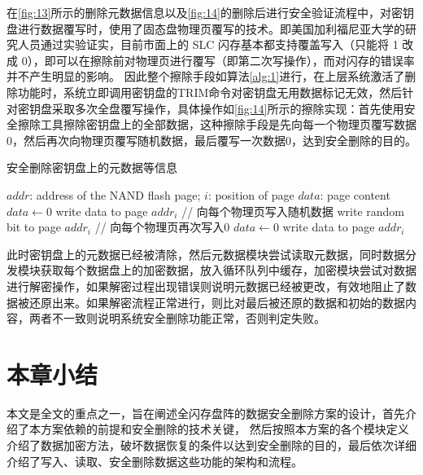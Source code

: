 在\autoref{fig:13}所示的删除元数据信息以及\autoref{fig:14}的删除后进行安全验证流程中，对密钥盘进行数据覆写时，使用了固态盘物理页覆写的技术。即美国加利福尼亚大学的研究人员通过实验证实\cite{Wei2011Reliably}，目前市面上的 SLC 闪存基本都支持覆盖写入（只能将 1 改成 0），即可以在擦除前对物理页进行覆写（即第二次写操作），而对闪存的错误率并不产生明显的影响。
因此整个擦除手段如算法\autoref{alg:1}进行，在上层系统激活了删除功能时，系统立即调用密钥盘的TRIM命令对密钥盘无用数据标记无效，然后针对密钥盘采取多次全盘覆写操作，具体操作如\autoref{fig:14}所示的擦除实现：首先使用安全擦除工具擦除密钥盘上的全部数据，这种擦除手段是先向每一个物理页覆写数据0，然后再次向物理页覆写随机数据，最后覆写一次数据0，达到安全删除的目的。
\begin{algorithm}[htb]
\caption{安全删除密钥盘上的元数据等信息}
\label{alg:1}
\begin{algorithmic}
	\REQUIRE
	$addr$: address of the NAND flash page;
	$i$: position of page
	$data$: page content
	\STATE $data \gets 0$
	\STATE write data to page $addr_i$
	\ENDFOR
	\STATE // 向每个物理页写入随机数据
	\STATE write random bit to page $addr_i$
	\ENDFOR
	\STATE // 向每个物理页再次写入0
	\STATE $data \gets 0$
	\STATE write data to page $addr_i$
	\ENDFOR
\end{algorithmic}
\end{algorithm}


此时密钥盘上的元数据已经被清除，然后元数据模块尝试读取元数据，同时数据分发模块获取每个数据盘上的加密数据，放入循环队列中缓存，加密模块尝试对数据进行解密操作，如果解密过程出现错误则说明元数据已经被更改，有效地阻止了数据被还原出来。如果解密流程正常进行，则比对最后被还原的数据和初始的数据内容，两者不一致则说明系统安全删除功能正常，否则判定失败。

\section{本章小结}
本文是全文的重点之一，旨在阐述全闪存盘阵的数据安全删除方案的设计，首先介绍了本方案依赖的前提和安全删除的技术关键，
然后按照本方案的各个模块定义介绍了数据加密方法，破坏数据恢复的条件以达到安全删除的目的，最后依次详细介绍了写入、读取、安全删除数据这些功能的架构和流程。
